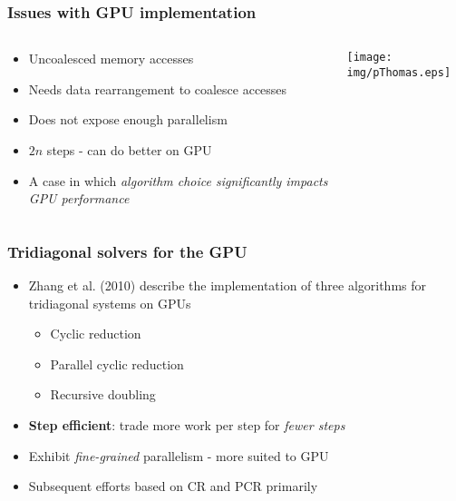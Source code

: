 \begin{frame}
\frametitle{Issues with GPU implementation}
\begin{columns}
\begin{column}{0.5\textwidth}
\begin{itemize}
    \item Uncoalesced memory accesses
    \item Needs data rearrangement to coalesce accesses
    \item Does not expose enough parallelism
    \item $2n$ steps - can do better on GPU
    \item A case in which \emph{algorithm choice
        significantly impacts GPU performance}
\end{itemize}
\end{column}
\begin{column}{0.5\textwidth}
    \texttt{[image: img/pThomas.eps]}
\end{column}
\end{columns}
\end{frame}

\begin{frame}
\frametitle{Tridiagonal solvers for the GPU}
\begin{itemize}
\item Zhang et al. (2010) describe the implementation
    of three algorithms for tridiagonal systems on GPUs
    \begin{itemize}
        \item Cyclic reduction
        \item Parallel cyclic reduction
        \item Recursive doubling
    \end{itemize}
\item \textbf{Step efficient}: trade more work per step for \emph{fewer steps}
\item Exhibit \emph{fine-grained} parallelism - more suited to GPU
\item Subsequent efforts based on CR and PCR primarily
\end{itemize}
\end{frame}

